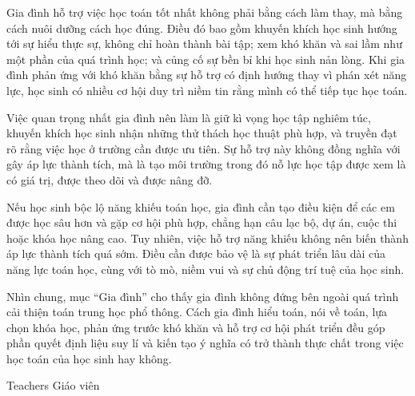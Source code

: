 {{    Gia đình hỗ trợ việc học toán tốt nhất không phải bằng cách làm thay, mà bằng cách nuôi dưỡng cách học đúng. Điều đó bao gồm khuyến khích học sinh hướng tới sự hiểu thực sự, không chỉ hoàn thành bài tập; xem khó khăn và sai lầm như một phần của quá trình học; và củng cố sự bền bỉ khi học sinh nản lòng. Khi gia đình phản ứng với khó khăn bằng sự hỗ trợ có định hướng thay vì phán xét năng lực, học sinh có nhiều cơ hội duy trì niềm tin rằng mình có thể tiếp tục học toán.

    Việc quan trọng nhất gia đình nên làm là giữ kì vọng học tập nghiêm túc, khuyến khích học sinh nhận những thử thách học thuật phù hợp, và truyền đạt rõ rằng việc học ở trường cần được ưu tiên. Sự hỗ trợ này không đồng nghĩa với gây áp lực thành tích, mà là tạo môi trường trong đó nỗ lực học tập được xem là có giá trị, được theo dõi và được nâng đỡ.

    Nếu học sinh bộc lộ năng khiếu toán học, gia đình cần tạo điều kiện để các em được học sâu hơn và gặp cơ hội phù hợp, chẳng hạn câu lạc bộ, dự án, cuộc thi hoặc khóa học nâng cao. Tuy nhiên, việc hỗ trợ năng khiếu không nên biến thành áp lực thành tích quá sớm. Điều cần được bảo vệ là sự phát triển lâu dài của năng lực toán học, cùng với tò mò, niềm vui và sự chủ động trí tuệ của học sinh.

    Nhìn chung, mục ``Gia đình'' cho thấy gia đình không đứng bên ngoài quá trình cải thiện toán trung học phổ thông. Cách gia đình hiểu toán, nói về toán, lựa chọn khóa học, phản ứng trước khó khăn và hỗ trợ cơ hội phát triển đều góp phần quyết định liệu suy lí và kiến tạo ý nghĩa có trở thành thực chất trong việc học toán của học sinh hay không.}
  }

\ParallelSection
  {Teachers}
  {Giáo viên}
  {}

